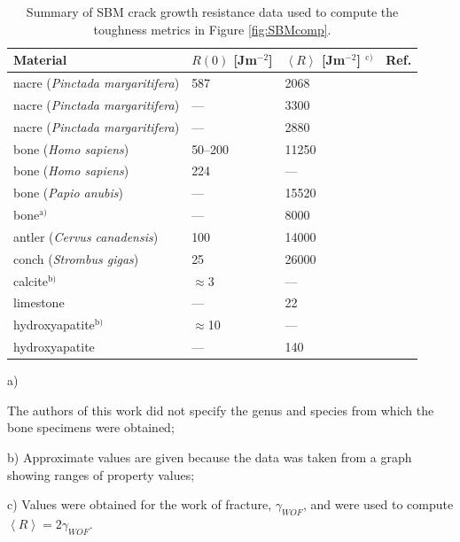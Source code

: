 \documentclass[12pt,onecolumn]{article}
\newcommand{\ra}[1]{\renewcommand{\arraystretch}{#1}}
\begin{document}
\begin{bibunit}
\begin{table}
\centering
\caption{Summary of SBM crack growth resistance data used to compute the toughness metrics in Figure \ref{fig:SBMcomp}.}
\label{tab:SBMsumm}
\ra{1.25}
\begin{threeparttable}[t]
\begin{tabular}{llll}
\toprule
Material & $R(0)$ [Jm$^{-2}$] & $\left< R\right>$ [Jm$^{-2}$] $^\text{c)}$ & Ref.\\
\midrule
nacre (\textit{Pinctada margaritifera}) & 587 & 2068 & \cite{jackson1988}\\
nacre (\textit{Pinctada margaritifera}) & --- & 3300 & \cite{currey1977}\\
nacre (\textit{Pinctada margaritifera}) & --- & 2880 & \cite{rabiei2010failure}\\
bone (\textit{Homo sapiens})& 50--200 & 11250 & \cite{koester2008true}\\
bone (\textit{Homo sapiens})& 224 & --- & \cite{nalla2005mechanistic}\\
bone (\textit{Papio anubis})& --- & 15520 & \cite{liu2000bending}\\
bone$^\text{a)}$ & --- & 8000 & \cite{currey1977}\\
antler (\textit{Cervus canadensis}) & 100 & 14000 & \cite{launey2009mechanistic}\\
conch (\textit{Strombus gigas}) & 25 & 26000 & \cite{kuhn1996fracture}\\
calcite$^\text{b)}$ & $\approx$3 & --- & \cite{wegst2004mechanical}\\
limestone & --- & 22& \cite{carmichael1982crc}\\
hydroxyapatite$^\text{b)}$ & $\approx$10 & --- & \cite{wegst2004mechanical}\\
hydroxyapatite & --- & 140 & \cite{tenhuisen1995formation}\\
\bottomrule
\end{tabular}
\begin{tablenotes}
\item[a)] {\footnotesize The authors of this work did not specify the genus and species from which the bone specimens were obtained;
\item[b)] Approximate values are given because the data was taken from a graph showing ranges of property values;
\item[c)] Values were obtained for the work of fracture, $\gamma_{WOF}$, and were used to compute $\left< R\right>=2\gamma_{WOF}$.}
\end{tablenotes}
\end{threeparttable}
\end{table}


\end{bibunit}
\end{document}
